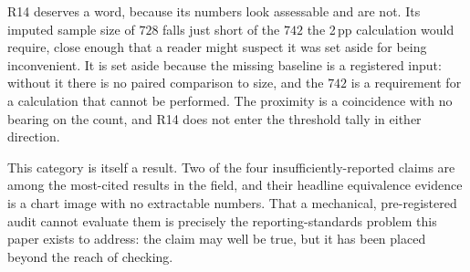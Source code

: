 R14 deserves a word, because its numbers look assessable and are not. Its
imputed sample size of $728$ falls just short of the $742$ the 2\,pp calculation
would require, close enough that a reader might suspect it was set aside for
being inconvenient. It is set aside because the missing baseline is a registered
input: without it there is no paired comparison to size, and the $742$ is a
requirement for a calculation that cannot be performed. The proximity is a
coincidence with no bearing on the count, and R14 does not enter the threshold
tally in either direction.

This category is itself a result. Two of the four insufficiently-reported claims
are among the most-cited results in the field, and their headline equivalence
evidence is a chart image with no extractable numbers. That a mechanical,
pre-registered audit cannot evaluate them is precisely the reporting-standards
problem this paper exists to address: the claim may well be true, but it has been
placed beyond the reach of checking.

